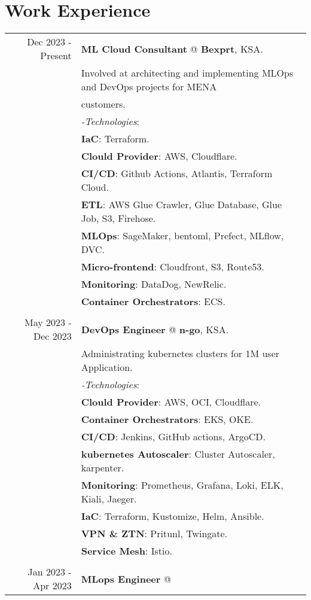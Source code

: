 \documentclass[a4paper,10pt]{article}
\begin{document}
\section{\textbf{Work Experience}}
\begin{longtable}{r|l}
    Dec 2023 - Present& \textbf{ML Cloud Consultant} @
    \textbf{Bexprt}, KSA. \\&
    Involved at architecting and implementing MLOps and DevOps projects for MENA \\& customers. \\&
    \textit{-Technologies}:\\&
    \textbf{IaC}: Terraform. \\&
    \textbf{Clould Provider}: AWS, Cloudflare. \\&
    \textbf{CI/CD}: Github Actions, Atlantis, Terraform Cloud. \\&
    \textbf{ETL}: AWS Glue Crawler, Glue Database, Glue Job, S3, Firehose. \\&
    \textbf{MLOps}: SageMaker, bentoml, Prefect, MLflow, DVC. \\&
    \textbf{Micro-frontend}: Cloudfront, S3, Route53. \\&
    \textbf{Monitoring}: DataDog, NewRelic. \\&
    \textbf{Container Orchestrators}: ECS. \\&
    \\
    May 2023 - Dec 2023 & \textbf{DevOps Engineer} @
    \textbf{n-go}, KSA. \\&
    Administrating kubernetes clusters for 1M user Application. \\&
    \textit{-Technologies}:\\&
    \textbf{Clould Provider}: AWS, OCI, Cloudflare. \\&
    \textbf{Container Orchestrators}: EKS, OKE. \\&
    \textbf{CI/CD}: Jenkins, GitHub actions, ArgoCD. \\&
    \textbf{kubernetes Autoscaler}: Cluster Autoscaler, karpenter. \\&
    \textbf{Monitoring}: Prometheus, Grafana, Loki, ELK, Kiali, Jaeger. \\&
    \textbf{IaC}: Terraform, Kustomize, Helm, Ansible.\\&
    \textbf{VPN \& ZTN}: Pritunl, Twingate. \\&
    \textbf{Service Mesh}: Istio. \\&
    \\
    Jan 2023 - Apr 2023 & \textbf{MLops Engineer} @

\end{longtable}
\end{document}
